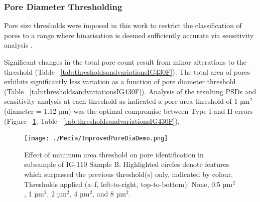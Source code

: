 \documentclass[review]{elsarticle}
\begin{document}
	\subsubsection{Pore Diameter Thresholding}
    
  Pore size thresholds were imposed in this work to restrict the classification
  of pores to a range where binarisation is deemed sufficiently accurate via
  sensitivity analysis \citep{Taylor2016, Huang2019, Kane2011a}. 
      
  Significant changes in the total pore count result from minor alterations to
  the threshold (Table ~\ref{tab:thresholdsandvariationsIG430F}). The
  total area of pores exhibits significantly less variation as a function of
  pore diameter threshold (Table ~\ref{tab:thresholdsandvariationsIG430F}).
  Analysis of the resulting PSDs and sensitivity analysis at each threshold as
  indicated a pore area threshold of 1 µm\(^2\) (diameter = 1.12 µm) was the
  optimal compromise between Type I and II errors (Figure
  ~\ref{fig:improvedporediademo}, Table
  ~\ref{tab:thresholdsandvariationsIG430F}),

   \begin{table}
  \centering
  \caption{Effect of different pore area thresholds on a subsection of IG-430F, showing the resulting pore count, total area, average pore size, and percentage area.}
  \label{tab:thresholdsandvariationsIG430F}
\end{table}

\begin{figure}[!htbp]
    \centering
    \texttt{[image: ./Media/ImprovedPoreDiaDemo.png]}
    \caption{Effect of minimum area threshold on pore identification in subsample of IG-110 Sample B. Highlighted circles denote features which surpassed the previous threshold(s) only, indicated by colour. Thresholds applied (a–f, left-to-right, top-to-bottom): None, 0.5 µm\(^2\), 1 µm\(^2\), 2 µm\(^2\), 4 µm\(^2\), and 8 µm\(^2\).}
    \label{fig:improvedporediademo}
\end{figure}
\end{document}
